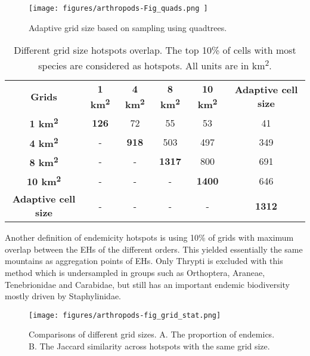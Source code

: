    \begin{figure}[htb!]
      \centering
      \texttt{[image: figures/arthropods-Fig\_quads.png ]}
      \caption[Adaptive grid size based on sampling using quadtrees]{Adaptive grid size based on sampling using quadtrees.}
      \label{fig:arthropods-figS5}
   \end{figure}

   \begin{table}[]
    \caption{Different grid size hotspots overlap. The top 10\% of cells with most species are considered as hotspots. All units are in km\textsuperscript{2}.}
\begin{tabular}{cccccc}
\textbf{Grids}              & \textbf{1 km\textsuperscript{2}} & \textbf{4 km\textsuperscript{2}} & \textbf{8 km\textsuperscript{2}} & \textbf{10 km\textsuperscript{2}} & \textbf{Adaptive cell size} \\
\textbf{1 km\textsuperscript{2}}              & \textbf{126}   & 72             & 55             & 53              & 41                          \\
\textbf{4 km\textsuperscript{2}}              & -              & \textbf{918}   & 503            & 497             & 349                         \\
\textbf{8 km\textsuperscript{2}}              & -              & -              & \textbf{1317}  & 800             & 691                         \\
\textbf{10 km\textsuperscript{2}}             & -              & -              & -              & \textbf{1400}   & 646                         \\
\textbf{Adaptive cell size} & -              & -              & -              & -               & \textbf{1312}              
\end{tabular}
\label{table:arthropods-tableS2}
\end{table}

   Another definition of endemicity hotspots is using 10\% of grids with maximum
overlap between the EHs of the different orders.
This yielded essentially the same mountains as aggregation points of EHs.
Only Thrypti is excluded with this method which is undersampled in groups such as
Orthoptera, Araneae, Tenebrionidae and Carabidae, but still has an important
endemic biodiversity mostly driven by Staphylinidae.

   \begin{figure}[htb!]
      \centering
      \texttt{[image: figures/arthropods-fig\_grid\_stat.png]}
      \caption[Comparisons of proportions of endemics across grid sizes hotspots]{Comparisons of different grid sizes. A. The proportion of endemics. B. The Jaccard similarity across hotspots with the same grid size.}
      \label{fig:arthropods-different-hotposts-stat}
   \end{figure}

